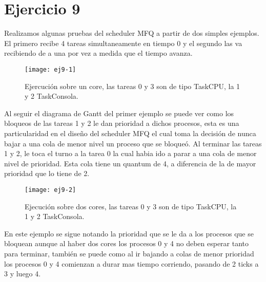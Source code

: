 \section{Ejercicio 9}

Realizamos algunas pruebas del scheduler MFQ a partir de dos simples ejemplos. El primero recibe 4 tareas simultaneamente en tiempo 0 y el segundo las va recibiendo de a una por vez a medida que el tiempo avanza.

\begin{figure}[H]
		\centering
		\texttt{[image: ej9-1]}
		\caption{Ejercución sobre un core, las tareas 0 y 3 son de tipo TaskCPU, la 1 y 2 TaskConsola.}
		\label{fig:ej9}
\end{figure}

Al seguir el diagrama de Gantt del primer ejemplo se puede ver como los bloqueos de las tareas 1 y 2 le dan prioridad a dichos procesos, esta es una particularidad en el diseño del scheduler MFQ el cual toma la decisión de nunca bajar a una cola de menor nivel un proceso que se bloqueó. Al terminar las tareas 1 y 2, le toca el turno a la tarea 0 la cual habia ido a parar a una cola de menor nivel de prioridad. Esta cola tiene un quantum de 4, a diferencia de la de mayor prioridad que lo tiene de 2.

\begin{figure}[H]
		\centering
		\texttt{[image: ej9-2]}
		\caption{Ejecución sobre dos cores, las tareas 0 y 3 son de tipo TaskCPU, la 1 y 2 TaskConsola. }
		\label{fig:ej9}
\end{figure}

En este ejemplo se sigue notando la prioridad que se le da a los procesos que se bloquean aunque al haber dos cores los procesos 0 y 4 no deben esperar tanto para terminar, también se puede como al ir bajando a colas de menor prioridad los procesos 0 y 4 comienzan a durar mas tiempo corriendo, pasando de 2 ticks a 3 y luego 4.